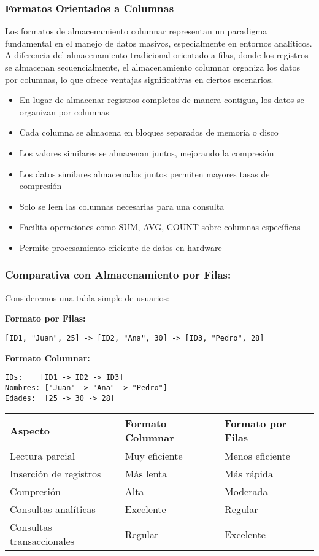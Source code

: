 \subsubsection{Formatos Orientados a Columnas}

Los formatos de almacenamiento columnar representan un paradigma fundamental en el manejo de datos masivos, 
especialmente en entornos analíticos. A diferencia del almacenamiento tradicional orientado a filas, 
donde los registros se almacenan secuencialmente, el almacenamiento columnar organiza los datos por columnas, 
lo que ofrece ventajas significativas en ciertos escenarios.

\begin{itemize}
    \item En lugar de almacenar registros completos de manera contigua, los datos se organizan por columnas
    \item Cada columna se almacena en bloques separados de memoria o disco
    \item Los valores similares se almacenan juntos, mejorando la compresión
    \item Los datos similares almacenados juntos permiten mayores tasas de compresión
    \item Solo se leen las columnas necesarias para una consulta
    \item Facilita operaciones como SUM, AVG, COUNT sobre columnas específicas
    \item Permite procesamiento eficiente de datos en hardware
\end{itemize}

\subsubsection{Comparativa con Almacenamiento por Filas:}

Consideremos una tabla simple de usuarios:

\textbf{Formato por Filas:}
\begin{verbatim}
[ID1, "Juan", 25] -> [ID2, "Ana", 30] -> [ID3, "Pedro", 28]
\end{verbatim}

\textbf{Formato Columnar:}
\begin{verbatim}
IDs:    [ID1 -> ID2 -> ID3]
Nombres: ["Juan" -> "Ana" -> "Pedro"]
Edades:  [25 -> 30 -> 28]
\end{verbatim}

\begin{tabular}{|l|l|l|}
\hline
\textbf{Aspecto} & \textbf{Formato Columnar} & \textbf{Formato por Filas} \\
\hline
Lectura parcial & Muy eficiente & Menos eficiente \\
\hline
Inserción de registros & Más lenta & Más rápida \\
\hline
Compresión & Alta & Moderada \\
\hline
Consultas analíticas & Excelente & Regular \\
\hline
Consultas transaccionales & Regular & Excelente \\
\hline
\end{tabular}

